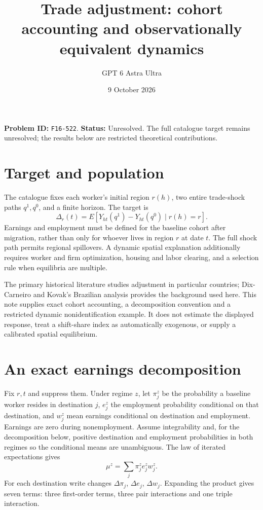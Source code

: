 \documentclass[11pt,a4paper]{article}
\title{Trade adjustment: cohort accounting and observationally equivalent dynamics}
\author{GPT 6 Astra Ultra}\date{9 October 2026}
\begin{document}
\maketitle
\textbf{Problem ID:} \texttt{F16-522}. \textbf{Status:} Unresolved. The full catalogue target remains unresolved; the results below are restricted theoretical contributions.

\section{Target and population}
The catalogue fixes each worker's initial region $r(h)$, two entire trade-shock paths $q^1,q^0$, and a finite horizon. The target is
\[
 \Delta_r(t)=E[Y_{ht}(q^1)-Y_{ht}(q^0)\mid r(h)=r].
\]
Earnings and employment must be defined for the baseline cohort after migration, rather than only for whoever lives in region $r$ at date $t$. The full shock path permits regional spillovers. A dynamic spatial explanation additionally requires worker and firm optimization, housing and labor clearing, and a selection rule when equilibria are multiple.

The primary historical literature studies adjustment in particular countries; Dix-Carneiro and Kovak's Brazilian analysis provides the background used here. This note supplies exact cohort accounting, a decomposition convention and a restricted dynamic nonidentification example. It does not estimate the displayed response, treat a shift-share index as automatically exogenous, or supply a calibrated spatial equilibrium.

\section{An exact earnings decomposition}
Fix $r,t$ and suppress them. Under regime $z$, let $\pi_j^z$ be the probability a baseline worker resides in destination $j$, $e_j^z$ the employment probability conditional on that destination, and $w_j^z$ mean earnings conditional on destination and employment. Earnings are zero during nonemployment. Assume integrability and, for the decomposition below, positive destination and employment probabilities in both regimes so the conditional means are unambiguous. The law of iterated expectations gives
\[
 \mu^z=\sum_j\pi_j^ze_j^zw_j^z.
\tag{1}
\]
For each destination write changes $\Delta\pi_j$, $\Delta e_j$, $\Delta w_j$. Expanding the product gives seven terms: three first-order terms, three pair interactions and one triple interaction.
\end{document}
